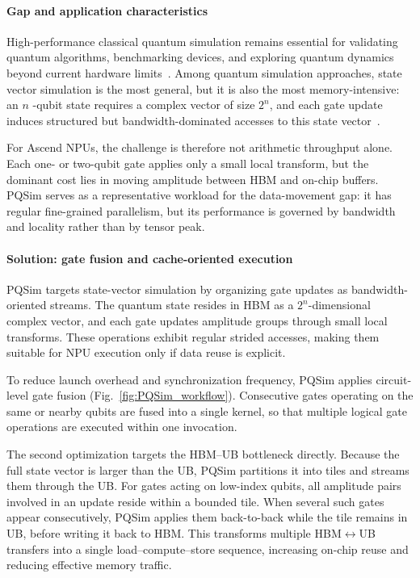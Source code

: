 \documentclass{article}
\begin{document}
\paragraph{Gap and application characteristics}
High-performance classical quantum simulation remains essential for validating quantum algorithms, benchmarking devices, and exploring quantum dynamics beyond current hardware limits~\cite{gill2020quantum}. Among quantum simulation approaches, state vector simulation is the most general, but it is also the most memory-intensive: an $n$ -qubit state requires a complex vector of size $2^n$, and each gate update induces structured but bandwidth-dominated accesses to this state vector~\cite{Nielsen2010}.

For Ascend NPUs, the challenge is therefore not arithmetic throughput alone. Each one- or two-qubit gate applies only a small local transform, but the dominant cost lies in moving amplitude between HBM and on-chip buffers. PQSim serves as a representative workload for the data-movement gap: it has regular fine-grained parallelism, but its performance is governed by bandwidth and locality rather than by tensor peak.

\paragraph{Solution: gate fusion and cache-oriented execution}
PQSim targets state-vector simulation by organizing gate updates as bandwidth-oriented streams. The quantum state resides in HBM as a $2^n$-dimensional complex vector, and each gate updates amplitude groups through small local transforms. These operations exhibit regular strided accesses, making them suitable for NPU execution only if data reuse is explicit.

To reduce launch overhead and synchronization frequency, PQSim applies circuit-level gate fusion (Fig.~\ref{fig:PQSim_workflow}). Consecutive gates operating on the same or nearby qubits are fused into a single kernel, so that multiple logical gate operations are executed within one invocation.

The second optimization targets the HBM--UB bottleneck directly. Because the full state vector is larger than the UB, PQSim partitions it into tiles and streams them through the UB. For gates acting on low-index qubits, all amplitude pairs involved in an update reside within a bounded tile. When several such gates appear consecutively, PQSim applies them back-to-back while the tile remains in UB, before writing it back to HBM. This transforms multiple HBM$\leftrightarrow$UB transfers into a single load--compute--store sequence, increasing on-chip reuse and reducing effective memory traffic.
\end{document}
